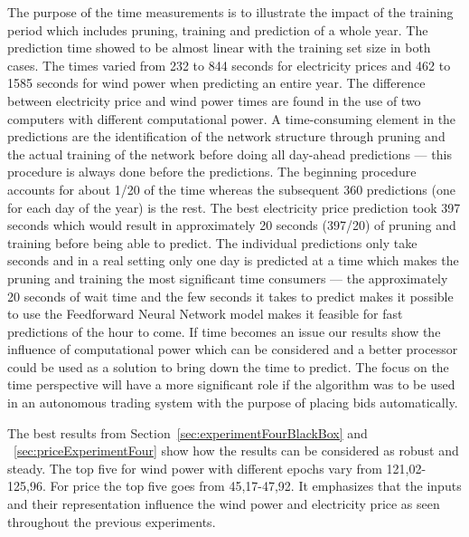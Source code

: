 The purpose of the time measurements is to illustrate the impact of the training period which includes pruning, training and prediction of a whole year. The prediction time showed to be almost linear with the training set size in both cases. The times varied from 232 to 844 seconds for electricity prices and 462 to 1585 seconds for wind power when predicting an entire year. The difference between electricity price and wind power times are found in the use of two computers with different computational power. A time-consuming element in the predictions are the identification of the network structure through pruning and the actual training of the network before doing all day-ahead predictions --- this procedure is always done before the predictions. The beginning procedure accounts for about 1/20 of the time whereas the subsequent 360 predictions (one for each day of the year) is the rest. The best electricity price prediction took 397 seconds which would result in approximately 20 seconds (397/20) of pruning and training before being able to predict. The individual predictions only take seconds and in a real setting only one day is predicted at a time which makes the pruning and training the most significant time consumers --- the approximately 20 seconds of wait time and the few seconds it takes to predict makes it possible to use the Feedforward Neural Network model makes it feasible for fast predictions of the hour to come. If time becomes an issue our results show the influence of computational power which can be considered and a better processor could be used as a solution to bring down the time to predict. The focus on the time perspective will have a more significant role if the algorithm was to be used in an autonomous trading system with the purpose of placing bids automatically.  

The best results from Section~\ref{sec:experimentFourBlackBox} and ~\ref{sec:priceExperimentFour} show how the results can be considered as robust and steady. The top five for wind power with different epochs vary from 121,02-125,96. For price the top five goes from 45,17-47,92. It emphasizes that the inputs and their representation influence the wind power and electricity price as seen throughout the previous experiments.

